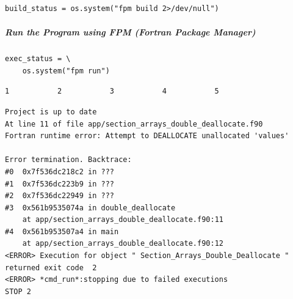 \begin{verbatim}
build_status = os.system("fpm build 2>/dev/null")
\end{verbatim}

\subparagraph{Run the Program using FPM (Fortran Package Manager)}

\begin{verbatim}
exec_status = \
    os.system("fpm run")
\end{verbatim}

\begin{verbatim}
1           2           3           4           5
\end{verbatim}

\begin{verbatim}
Project is up to date
At line 11 of file app/section_arrays_double_deallocate.f90
Fortran runtime error: Attempt to DEALLOCATE unallocated 'values'

Error termination. Backtrace:
#0  0x7f536dc218c2 in ???
#1  0x7f536dc223b9 in ???
#2  0x7f536dc22949 in ???
#3  0x561b9535074a in double_deallocate
	at app/section_arrays_double_deallocate.f90:11
#4  0x561b953507a4 in main
	at app/section_arrays_double_deallocate.f90:12
<ERROR> Execution for object " Section_Arrays_Double_Deallocate " returned exit code  2
<ERROR> *cmd_run*:stopping due to failed executions
STOP 2
\end{verbatim}